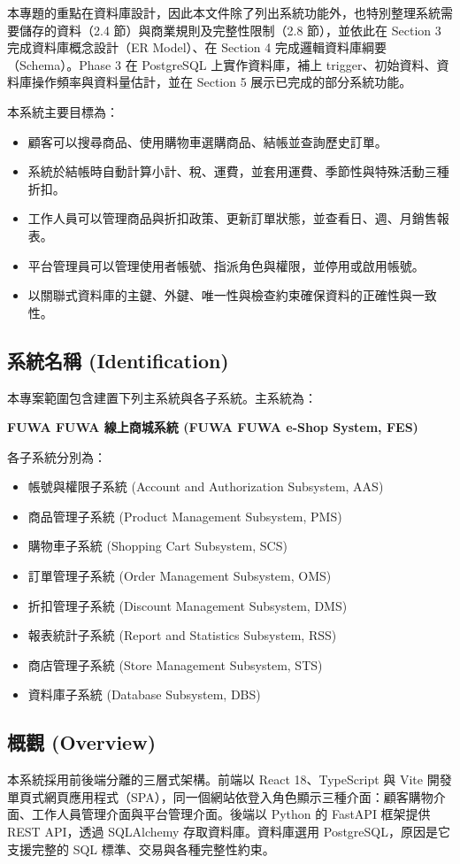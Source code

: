 \documentclass[12pt,a4paper]{article}
\begin{document}
本專題的重點在資料庫設計，因此本文件除了列出系統功能外，也特別整理系統需要儲存的資料（2.4 節）與商業規則及完整性限制（2.8 節），並依此在 Section 3 完成資料庫概念設計（ER Model）、在 Section 4 完成邏輯資料庫綱要（Schema）。Phase 3 在 PostgreSQL 上實作資料庫，補上 trigger、初始資料、資料庫操作頻率與資料量估計，並在 Section 5 展示已完成的部分系統功能。

本系統主要目標為：
\begin{itemize}
  \item 顧客可以搜尋商品、使用購物車選購商品、結帳並查詢歷史訂單。
  \item 系統於結帳時自動計算小計、稅、運費，並套用運費、季節性與特殊活動三種折扣。
  \item 工作人員可以管理商品與折扣政策、更新訂單狀態，並查看日、週、月銷售報表。
  \item 平台管理員可以管理使用者帳號、指派角色與權限，並停用或啟用帳號。
  \item 以關聯式資料庫的主鍵、外鍵、唯一性與檢查約束確保資料的正確性與一致性。
\end{itemize}

\subsection{系統名稱 (Identification)}
本專案範圍包含建置下列主系統與各子系統。主系統為：

\textbf{FUWA FUWA 線上商城系統 (FUWA FUWA e-Shop System, FES)}

各子系統分別為：
\begin{itemize}
  \item 帳號與權限子系統 (Account and Authorization Subsystem, AAS)
  \item 商品管理子系統 (Product Management Subsystem, PMS)
  \item 購物車子系統 (Shopping Cart Subsystem, SCS)
  \item 訂單管理子系統 (Order Management Subsystem, OMS)
  \item 折扣管理子系統 (Discount Management Subsystem, DMS)
  \item 報表統計子系統 (Report and Statistics Subsystem, RSS)
  \item 商店管理子系統 (Store Management Subsystem, STS)
  \item 資料庫子系統 (Database Subsystem, DBS)
\end{itemize}

\subsection{概觀 (Overview)}
本系統採用前後端分離的三層式架構。前端以 React 18、TypeScript 與 Vite 開發單頁式網頁應用程式（SPA），同一個網站依登入角色顯示三種介面：顧客購物介面、工作人員管理介面與平台管理介面。後端以 Python 的 FastAPI 框架提供 REST API，透過 SQLAlchemy 存取資料庫。資料庫選用 PostgreSQL，原因是它支援完整的 SQL 標準、交易與各種完整性約束。
\end{document}
